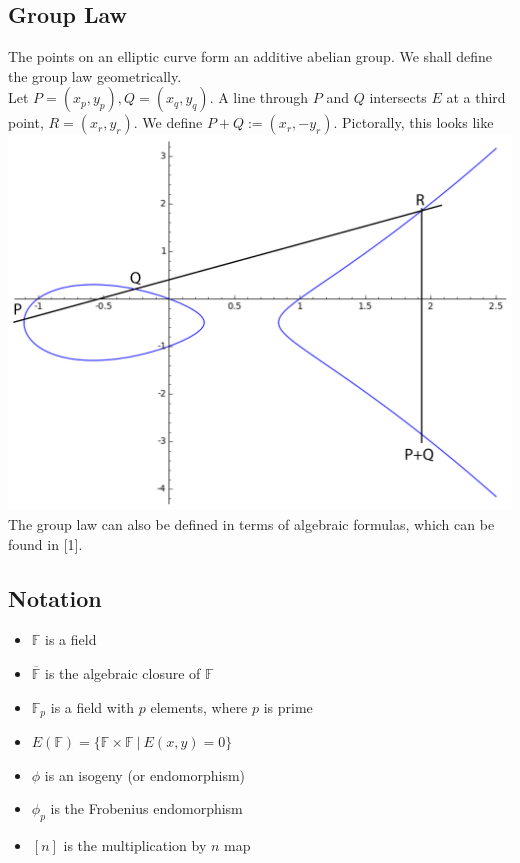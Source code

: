 \documentclass[12pt,twoside]{article}
\newcommand\given[1][]{\:#1\vert\:}
\begin{document}
\subsection{Group Law} 
The points on an elliptic curve form an additive abelian group. We shall define the group law geometrically. \\
Let $P = (x_p, y_p), Q = (x_q, y_q)$. A line through $P$ and $Q$ intersects $E$ at a third point, $R = (x_r,y_r)$. We define $P + Q := (x_r,-y_r)$. Pictorally, this looks like \\
\includegraphics[width=6in]{grouplaw.png}
The group law can also be defined in terms of algebraic formulas, which can be found in [1]. %

\subsection{Notation}
\begin{itemize}
\item $\mathbb F$ is a field
\item $\overline{\mathbb F}$ is the algebraic closure of $\mathbb F$
\item $\mathbb F_p$ is a field with $p$ elements, where $p$ is prime
\item $E(\mathbb F) = \{\mathbb F \times \mathbb F \given E(x,y) = 0\}$
\item $\phi$ is an isogeny (or endomorphism)
\item $\phi_p$ is the Frobenius endomorphism
\item $[n]$ is the multiplication by $n$ map
\end{itemize}
\end{document}
